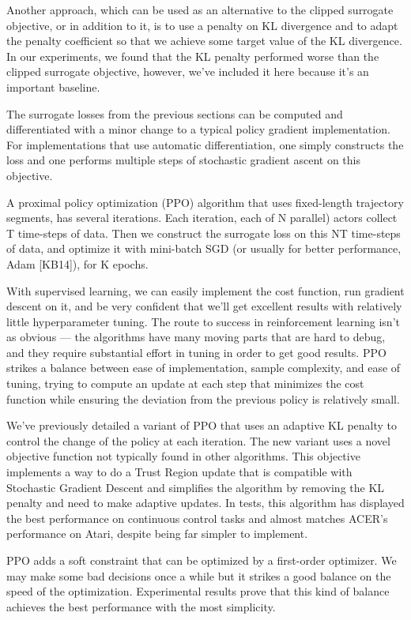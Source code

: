 \documentclass[conference]{IEEEtran}
\begin{document}
Another approach, which can be used as an alternative to the clipped surrogate objective, or in addition to it, is to use a penalty on KL divergence and to adapt the penalty coefficient so that we achieve some target value of the KL divergence. In our experiments, we found that the KL penalty performed worse than the clipped surrogate objective, however, we’ve included it here because it’s an important baseline.

The surrogate losses from the previous sections can be computed and differentiated with a minor change to a typical policy gradient implementation. For implementations that use automatic differentiation, one simply constructs the loss and one performs multiple steps of stochastic gradient ascent on this objective.

A proximal policy optimization (PPO) algorithm that uses fixed-length trajectory segments, has several iterations. Each iteration, each of N  parallel) actors collect T time-steps of data. Then we construct the surrogate loss on this NT time-steps of data, and optimize it with mini-batch SGD (or usually for better performance, Adam [KB14]), for K epochs.

With supervised learning, we can easily implement the cost function, run gradient descent on it, and be very confident that we’ll get excellent results with relatively little hyperparameter tuning. The route to success in reinforcement learning isn’t as obvious — the algorithms have many moving parts that are hard to debug, and they require substantial effort in tuning in order to get good results. PPO strikes a balance between ease of implementation, sample complexity, and ease of tuning, trying to compute an update at each step that minimizes the cost function while ensuring the deviation from the previous policy is relatively small.

We’ve previously detailed a variant of PPO that uses an adaptive KL penalty to control the change of the policy at each iteration. The new variant uses a novel objective function not typically found in other algorithms. This objective implements a way to do a Trust Region update that is compatible with Stochastic Gradient Descent and simplifies the algorithm by removing the KL penalty and need to make adaptive updates. In tests, this algorithm has displayed the best performance on continuous control tasks and almost matches ACER’s performance on Atari, despite being far simpler to implement.

PPO adds a soft constraint that can be optimized by a first-order optimizer. We may make some bad decisions once a while but it strikes a good balance on the speed of the optimization. Experimental results prove that this kind of balance achieves the best performance with the most simplicity.\\
\end{document}
